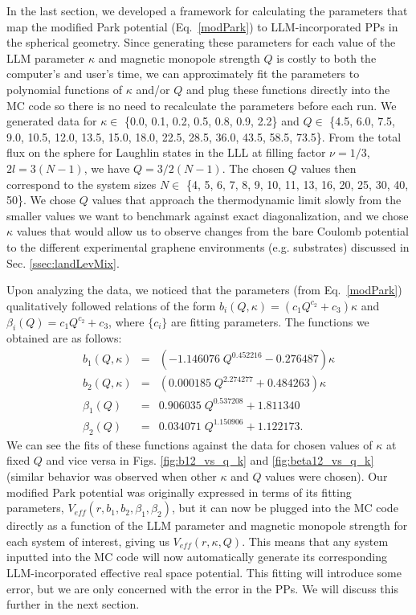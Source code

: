     In the last section, we developed a framework for calculating the parameters that map the modified Park potential (Eq.~\ref{modPark}) to LLM-incorporated PPs in the spherical geometry. Since generating these parameters for each value of the LLM parameter $\kappa$ and magnetic monopole strength $Q$ is costly to both the computer's and user's time, we can approximately fit the parameters to polynomial functions of $\kappa$ and/or $Q$ and plug these functions directly into the MC code so there is no need to recalculate the parameters before each run. We generated data for $\kappa\in$ \{0.0, 0.1, 0.2, 0.5, 0.8, 0.9, 2.2\} and $Q\in$ \{4.5, 6.0, 7.5, 9.0, 10.5, 12.0, 13.5, 15.0, 18.0, 22.5, 28.5, 36.0, 43.5, 58.5, 73.5\}. From the total flux on the sphere for Laughlin states in the LLL at filling factor $\nu=1/3$, $2l=3(N-1)$, we have $Q=3/2(N-1)$. The chosen $Q$ values then correspond to the system sizes $N\in$ \{4, 5, 6, 7, 8, 9, 10, 11, 13, 16, 20, 25, 30, 40, 50\}. We chose $Q$ values that approach the thermodynamic limit slowly from the smaller values we want to benchmark against exact diagonalization, and we chose $\kappa$ values that would allow us to observe changes from the bare Coulomb potential to the different experimental graphene environments (e.g. substrates) discussed in Sec. \ref{ssec:landLevMix}. 
    
    Upon analyzing the data, we noticed that the parameters (from Eq.~\ref{modPark}) qualitatively followed relations of the form $b_i(Q,\kappa)=(c_1Q^{c_2}+c_3)\kappa$ and $\beta_i(Q)=c_1Q^{c_2}+c_3$, where $\{c_i\}$ are fitting parameters. The functions we obtained are as follows:
    \begin{eqnarray} \label{eqn:paramEq}
        b_1(Q,\kappa)&=&(-1.146076\;Q^{0.452216}-0.276487)\kappa \\ \label{eq:b2}
        b_2(Q,\kappa)&=&(0.000185\;Q^{2.274277}+0.484263)\kappa \\ \label{eq:beta1}
        \beta_1(Q)&=&0.906035\;Q^{0.537208}+1.811340 \\
        \beta_2(Q)&=&0.034071\;Q^{1.150906}+1.122173. \label{eqn:lastPar}
    \end{eqnarray} 
    We can see the fits of these functions against the data for chosen values of $\kappa$ at fixed $Q$ and vice versa in Figs. \ref{fig:b12_vs_q_k} and \ref{fig:beta12_vs_q_k} (similar behavior was observed when other $\kappa$ and $Q$ values were chosen). Our modified Park potential was originally expressed in terms of its fitting parameters, $V_{eff}(r,b_1,b_2,\beta_1,\beta_2)$, but it can now be plugged into the MC code directly as a function of the LLM parameter and magnetic monopole strength for each system of interest, giving us $V_{eff}(r,\kappa,Q)$. This means that any system inputted into the MC code will now automatically generate its corresponding LLM-incorporated effective real space potential. This fitting will introduce some error, but we are only concerned with the error in the PPs. We will discuss this further in the next section.
    
